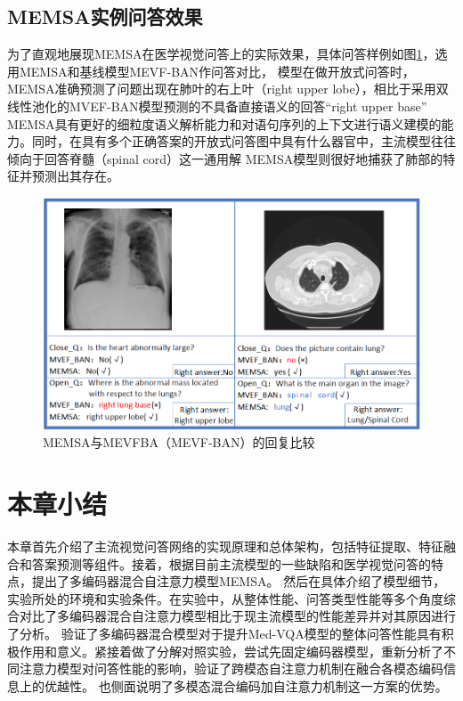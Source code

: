 \subsection{MEMSA实例问答效果}
为了直观地展现MEMSA在医学视觉问答上的实际效果，具体问答样例如图\ref{fig:qa_demo}，选用MEMSA和基线模型MEVF-BAN作问答对比，
模型在做开放式问答时，MEMSA准确预测了问题出现在肺叶的右上叶（right upper lobe），相比于采用双线性池化的MVEF-BAN模型预测的不具备直接语义的回答“right upper base”
MEMSA具有更好的细粒度语义解析能力和对语句序列的上下文进行语义建模的能力。同时，在具有多个正确答案的开放式问答图中具有什么器官中，主流模型往往倾向于回答脊髓（spinal cord）这一通用解
MEMSA模型则很好地捕获了肺部的特征并预测出其存在。
\begin{figure}[htbp]
	\centering	
	\includegraphics[width=1\textwidth]{Fig/myfig/chapter3/qa_demo.png}  %
	\caption{\label{fig:qa_demo}MEMSA与MEVFBA（MEVF-BAN）的回复比较} 
\end{figure}


\section{本章小结}
本章首先介绍了主流视觉问答网络的实现原理和总体架构，包括特征提取、特征融合和答案预测等组件。接着，根据目前主流模型的一些缺陷和医学视觉问答的特点，提出了多编码器混合自注意力模型MEMSA。
然后在具体介绍了模型细节，实验所处的环境和实验条件。在实验中，从整体性能、问答类型性能等多个角度综合对比了多编码器混合自注意力模型相比于现主流模型的性能差异并对其原因进行了分析。
验证了多编码器混合模型对于提升Med-VQA模型的整体问答性能具有积极作用和意义。紧接着做了分解对照实验，尝试先固定编码器模型，重新分析了不同注意力模型对问答性能的影响，验证了跨模态自注意力机制在融合各模态编码信息上的优越性。
也侧面说明了多模态混合编码加自注意力机制这一方案的优势。

\newpage
\vspace*{\fill}











